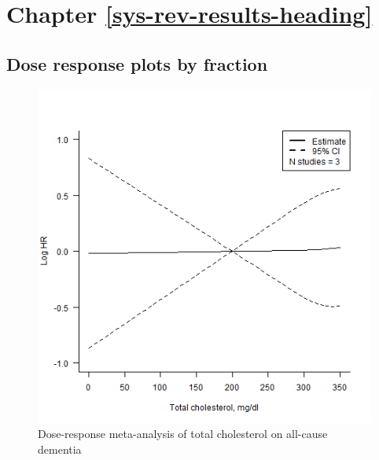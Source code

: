 \documentclass[a4paper, twoside]{templates/ociamthesis}
\begin{document}
\hypertarget{chapter-refsys-rev-results-heading}{%
\section{Chapter \ref{sys-rev-results-heading}}\label{chapter-refsys-rev-results-heading}}

\hypertarget{dose-response-plots-by-fraction}{%
\subsection{Dose response plots by fraction}\label{dose-response-plots-by-fraction}}





\begin{figure}[H]
\includegraphics[width=1\linewidth]{figures/sys-rev/dr_Dementia_TC} \caption[shortcap]{Dose-response meta-analysis of total cholesterol on all-cause dementia}\label{fig:drDemeniaTC}
\end{figure}
\end{document}
